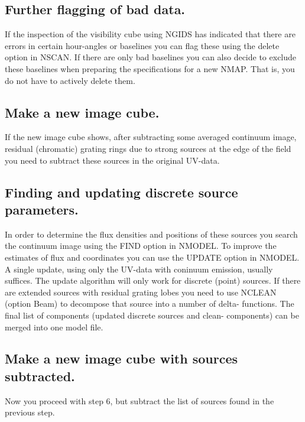 \subsection{Further flagging of bad data.} 
\label{.remain.flag} 

If the inspection of the visibility cube using NGIDS has indicated that there
are errors in certain hour-angles or baselines you can flag these using the
delete option in NSCAN. If there are only bad baselines you can also decide to
exclude these baselines when preparing the specifications for a new NMAP. That
is, you do not have to actively delete them. 

\subsection{Make a new image cube.} 
\label{.remain.newcube} 

If the new image cube shows, after subtracting some averaged continuum image,
residual (chromatic) grating rings due to strong sources at the edge of the
field you need to subtract these sources in the original UV-data. 

\subsection{Finding and updating discrete source parameters.} 
\label{.remain.sourcepar} 

In order to determine the flux densities and positions of these sources you
search the continuum image using the FIND option in NMODEL. To improve the
estimates of flux and coordinates you can use the UPDATE option in NMODEL. A
single update, using only the UV-data with coninuum emission, usually suffices.
 The update algorithm will only work for discrete (point) sources. If there are
extended sources with residual grating lobes you need to use NCLEAN (option
Beam) to decompose that source into a number of delta- functions. The final
list of components (updated discrete sources and clean- components) can be
merged into one model file. 

\subsection{Make a new image cube with sources subtracted.} 
\label{.remain.subtr} 

Now you proceed with step 6, but subtract the list of sources found in the
previous step. 

